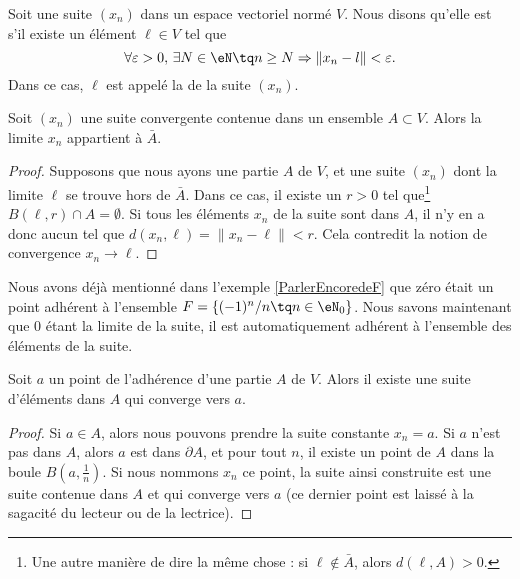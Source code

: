 \begin{definition}		\label{DefCvSuiteEGVN}
	Soit une suite $(x_n)$ dans un espace vectoriel normé $V$. Nous disons qu'elle est
     s'il existe un élément $\ell\in V$ tel que
	\begin{equation}
		\forall \varepsilon>0,\,\exists N\in\eN\tq n\geq N\Rightarrow \| x_n-l \|<\varepsilon.
	\end{equation}
	Dans ce cas, $\ell$ est appelé la  de la suite $(x_n)$.
\end{definition}


\begin{lemma}		\label{LemLimAbarA}
	Soit $(x_n)$ une suite convergente contenue dans un ensemble $A\subset V$. Alors la limite $x_n$ appartient à $\bar A$.
\end{lemma}

\begin{proof}
	Supposons que nous ayons une partie $A$ de $V$, et une suite $(x_n)$ dont la limite $\ell$ se trouve hors de $\bar A$. Dans ce cas, il existe un $r>0$ tel que\footnote{Une autre manière de dire la même chose : si $\ell\notin\bar A$, alors $d(\ell,A)>0$.} $B(\ell,r)\cap A=\emptyset$. Si tous les éléments $x_n$ de la suite sont dans $A$, il n'y en a donc aucun tel que $d(x_n,\ell)=\| x_n-\ell \|<r$. Cela contredit la notion de convergence $x_n\to \ell$.
\end{proof}

Nous avons déjà mentionné dans l'exemple \ref{ParlerEncoredeF} que zéro était un point adhérent à l'ensemble $F=\{ (-1)^n/n\tq n\in\eN_0 \}$. Nous savons maintenant que $0$ étant la limite de la suite, il est automatiquement adhérent à l'ensemble des éléments de la suite.

\begin{corollary}		\label{CorAdhEstLim}
	Soit $a$ un point de l'adhérence d'une partie $A$ de $V$. Alors il existe une suite d'éléments dans $A$ qui converge vers $a$.
\end{corollary}

\begin{proof}
	Si $a\in A$, alors nous pouvons prendre la suite constante $x_n=a$. Si $a$ n'est pas dans $A$, alors $a$ est dans $\partial A$, et pour tout $n$, il existe un point de $A$ dans la boule $B(a,\frac{1}{ n })$. Si nous nommons $x_n$ ce point, la suite ainsi construite est une suite contenue dans $A$ et qui converge vers $a$ (ce dernier point est laissé à la sagacité du lecteur ou de la lectrice).
\end{proof}

